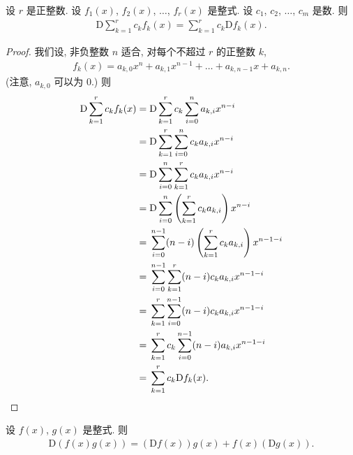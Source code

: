 \documentclass[../libro.tex]{subfiles}
\begin{document}
\begin{theorem}
    设 \(r\) 是正整数.
    设 \(f_1 (x)\), \(f_2 (x)\), \(\dots\), \(f_r (x)\) 是整式.
    设 \(c_1\), \(c_2\), \(\dots\), \(c_m\) 是数.
    则
    \begin{align*}
        \mathrm{D} \sum_{k = 1}^{r} {c_k f_k (x)}
        = \sum_{k = 1}^{r} {c_k \mathrm{D} f_k (x)}.
    \end{align*}
\end{theorem}

\begin{proof}
    我们设, 非负整数 \(n\) 适合,
    对每个不超过 \(r\) 的正整数 \(k\),
    \begin{align*}
        f_k (x)
        = a_{k,0} x^n + a_{k,1} x^{n-1}
        + \dots + a_{k,n-1} x + a_{k,n}.
    \end{align*}
    (注意, \(a_{k,0}\) 可以为 \(0\).)
    则
    \begin{align*}
        \mathrm{D} \sum_{k = 1}^{r} {c_k f_k (x)}
        = {} &
        \mathrm{D}
        \sum_{k = 1}^{r}
        c_k
        \sum_{i = 0}^{n}
        a_{k,i} x^{n-i}
        \\
        = {} &
        \mathrm{D}
        \sum_{k = 1}^{r}
        \sum_{i = 0}^{n}
        c_k a_{k,i} x^{n-i}
        \\
        = {} &
        \mathrm{D}
        \sum_{i = 0}^{n}
        \sum_{k = 1}^{r}
        c_k a_{k,i} x^{n-i}
        \\
        = {} &
        \mathrm{D}
        \sum_{i = 0}^{n}
        \left(\sum_{k = 1}^{r} c_k a_{k,i}\right)
        x^{n-i}
        \\
        = {} &
        \sum_{i = 0}^{n-1}
        (n-i) \left(\sum_{k = 1}^{r} c_k a_{k,i}\right)
        x^{n-1-i}
        \\
        = {} &
        \sum_{i = 0}^{n-1}
        \sum_{k = 1}^{r}
        (n-i) c_k a_{k,i} x^{n-1-i}
        \\
        = {} &
        \sum_{k = 1}^{r}
        \sum_{i = 0}^{n-1}
        (n-i) c_k a_{k,i} x^{n-1-i}
        \\
        = {} &
        \sum_{k = 1}^{r}
        c_k
        \sum_{i = 0}^{n-1}
        (n-i) a_{k,i} x^{n-1-i}
        \\
        = {} &
        \sum_{k = 1}^{r}
        c_k
        \mathrm{D} f_k (x).
        \qedhere
    \end{align*}
\end{proof}

\begin{theorem}
    设 \(f(x)\), \(g(x)\) 是整式.
    则
    \begin{align*}
        \mathrm{D} (f(x) g(x))
        = (\mathrm{D} f(x)) g(x) + f(x) (\mathrm{D} g(x)).
    \end{align*}
\end{theorem}
\end{document}
